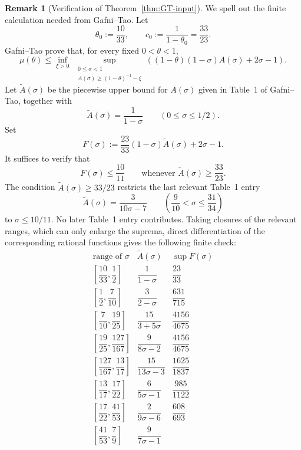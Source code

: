 \documentclass[11pt,reqno]{amsart}
\numberwithin{equation}{section}
\theoremstyle{plain}
\theoremstyle{definition}
\newtheorem{remark}[theorem]{Remark}
\begin{document}
\begin{remark}[Verification of Theorem~\ref{thm:GT-input}]
We spell out the finite calculation needed from Gafni--Tao.  Let
\[
        \theta_0:=\frac{10}{33},
        \qquad
        c_0:=\frac{1}{1-\theta_0}=\frac{33}{23}.
\]
Gafni--Tao prove that, for every fixed \(0<\theta<1\),
\[
\mu(\theta)\le
\inf_{\xi>0}\ 
\sup_{\substack{0\le \sigma<1\\
        A(\sigma)\ge (1-\theta)^{-1}-\xi}}
\left((1-\theta)(1-\sigma)A(\sigma)+2\sigma-1\right).
\]
Let \(\widetilde A(\sigma)\) be the piecewise upper bound for \(A(\sigma)\)
given in Table~1 of Gafni--Tao, together with
\[
        \widetilde A(\sigma)=\frac{1}{1-\sigma}
        \qquad (0\le \sigma\le 1/2).
\]
Set
\[
        F(\sigma):=
        \frac{23}{33}(1-\sigma)\widetilde A(\sigma)+2\sigma-1.
\]
It suffices to verify that
\[
        F(\sigma)\le \frac{10}{11}
        \qquad
        \text{whenever }\widetilde A(\sigma)\ge \frac{33}{23}.
\]
The condition \(\widetilde A(\sigma)\ge 33/23\) restricts the last relevant
Table~1 entry
\[
        \widetilde A(\sigma)=\frac{3}{10\sigma-7}
        \qquad
        \left(\frac9{10}<\sigma\le \frac{31}{34}\right)
\]
to \(\sigma\le 10/11\).  No later Table~1 entry contributes.  Taking closures
of the relevant ranges, which can only enlarge the suprema, direct
differentiation of the corresponding rational functions gives the following
finite check:
\[
\begin{array}{c|c|c}
\text{range of }\sigma
&
\widetilde A(\sigma)
&
\displaystyle \sup F(\sigma)
\\ \hline
\left[\dfrac{10}{33},\dfrac12\right]
&
\dfrac{1}{1-\sigma}
&
\dfrac{23}{33}
\\[6pt]
\left[\dfrac12,\dfrac{7}{10}\right]
&
\dfrac{3}{2-\sigma}
&
\dfrac{631}{715}
\\[6pt]
\left[\dfrac{7}{10},\dfrac{19}{25}\right]
&
\dfrac{15}{3+5\sigma}
&
\dfrac{4156}{4675}
\\[6pt]
\left[\dfrac{19}{25},\dfrac{127}{167}\right]
&
\dfrac{9}{8\sigma-2}
&
\dfrac{4156}{4675}
\\[6pt]
\left[\dfrac{127}{167},\dfrac{13}{17}\right]
&
\dfrac{15}{13\sigma-3}
&
\dfrac{1625}{1837}
\\[6pt]
\left[\dfrac{13}{17},\dfrac{17}{22}\right]
&
\dfrac{6}{5\sigma-1}
&
\dfrac{985}{1122}
\\[6pt]
\left[\dfrac{17}{22},\dfrac{41}{53}\right]
&
\dfrac{2}{9\sigma-6}
&
\dfrac{608}{693}
\\[6pt]
\left[\dfrac{41}{53},\dfrac79\right]
&
\dfrac{9}{7\sigma-1}

\end{array}\]
\end{remark}
\end{document}
